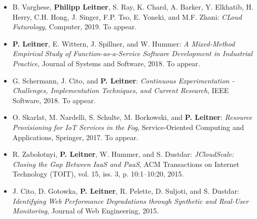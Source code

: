\documentclass[paper=letter,fontsize=11pt]{scrartcl} %
\begin{document}
\begin{itemize}
	\item  B. Varghese, \textbf{Philipp Leitner}, S. Ray, K. Chard, A. Barker, Y. Elkhatib, H. Herry, C.H. Hong, J. Singer, F.P. Tso, E. Yoneki, and M.F. Zhani: \emph{CLoud Futurology}, Computer, 2019. To appear.
	\item \textbf{P. Leitner}, E. Wittern, J. Spillner, and W. Hummer: \emph{A Mixed-Method Empirical Study of Function-as-a-Service Software Development in Industrial Practice}, Journal of Systems and Software, 2018. To appear.
	\item  G. Schermann, J. Cito, and \textbf{P. Leitner}: \emph{Continuous Experimentation - Challenges, Implementation Techniques, and Current Research}, IEEE Software, 2018. To appear.
	\item  O. Skarlat, M. Nardelli, S. Schulte, M. Borkowski, and \textbf{P. Leitner}: \emph{Resource Provisioning for IoT Services in the Fog}, Service-Oriented Computing and Applications, Springer, 2017. To appear.
  \item  R. Zabolotnyi, \textbf{P. Leitner}, W. Hummer, and S. Dustdar: \emph{JCloudScale: Closing the Gap Between IaaS and PaaS}, ACM Transactions on Internet Technology (TOIT),  vol. 15, iss. 3, p. 10:1–10:20, 2015.
  \item J. Cito, D. Gotowka, \textbf{P. Leitner}, R. Pelette, D. Suljoti, and S. Dustdar: \emph{Identifying Web Performance Degradations through Synthetic and Real-User Monitoring}, Journal of Web Engineering, 2015.

\end{itemize}
\end{document}

